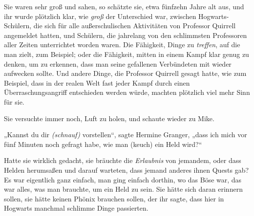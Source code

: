 Sie waren sehr groß und sahen, so schätzte sie, etwa fünfzehn Jahre alt aus, und ihr wurde plötzlich klar, wie \emph{groß} der Unterschied war, zwischen Hogwarts-Schülern, die sich für alle außerschulischen Aktivitäten von Professor Quirrell angemeldet hatten, und Schülern, die jahrelang von den schlimmsten Professoren aller Zeiten unterrichtet worden waren. Die Fähigkeit, Dinge zu \emph{treffen}, auf die man zielt, zum Beispiel; oder die Fähigkeit, mitten in einem Kampf klar genug zu denken, um zu erkennen, dass man seine gefallenen Verbündeten mit  wieder aufwecken sollte. Und andere Dinge, die Professor Quirrell gesagt hatte, wie zum Beispiel, dass in der realen Welt fast jeder Kampf durch einen Überraschungsangriff entschieden werden würde, machten plötzlich viel mehr Sinn für sie.

Sie versuchte immer noch, Luft zu holen, und schaute wieder zu Mike.

„Kannst du dir \emph{(schnauf)} vorstellen“, sagte Hermine Granger, „dass ich mich vor fünf Minuten noch gefragt habe, wie man (keuch) ein Held wird?“

Hatte sie wirklich gedacht, sie bräuchte die \emph{Erlaubnis} von jemandem, oder dass Helden herumsaßen und darauf warteten, dass jemand anderes ihnen Quests gab? Es war eigentlich ganz einfach, man ging einfach dorthin, wo das Böse war, das war alles, was man brauchte, um ein Held zu sein. Sie hätte sich daran erinnern sollen, sie hätte keinen Phönix brauchen sollen, der ihr sagte, dass hier in Hogwarts manchmal schlimme Dinge passierten.

